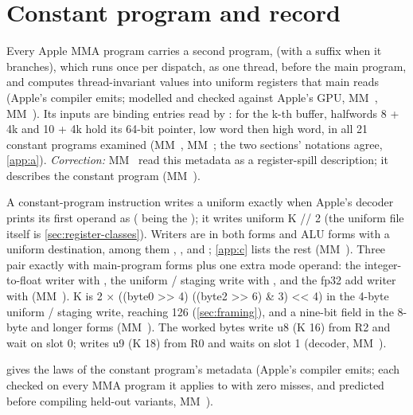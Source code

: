 \section{Constant program and record}\label{sec:constant-program-record}

Every Apple MMA program carries a second program,  (with a  suffix when
it branches), which runs once per dispatch, as one thread, before the main program, and computes thread-invariant values
into uniform registers that main reads (Apple's compiler emits; modelled and checked against Apple's GPU, MM~,
MM~). Its inputs are binding entries read by : for the k-th buffer,
halfwords 8 + 4k and 10 + 4k hold its 64-bit pointer, low word then high word, in all 21 constant programs examined
(MM~, MM~; the two sections' notations agree, \cref{app:a}). \emph{Correction:} MM~ read this metadata as a
register-spill description; it describes the constant program (MM~).

A constant-program instruction writes a uniform exactly when Apple's decoder
prints its first operand as  ( being the ); it writes uniform
K // 2 (the uniform file itself is \cref{sec:register-classes}). Writers are  in both forms and ALU forms
with a uniform destination, among them , ,  and ; \cref{app:c} lists the rest (MM~). Three pair exactly with main-program forms
plus one extra mode operand: the integer-to-float writer with , the uniform / staging
write with , and the fp32 add writer with 
(MM~). K is 2 × ((byte0 >{}> 4) \textbar{} ((byte2 >{}> 6) \& 3) <{}< 4) in the 4-byte uniform / staging write, reaching 126 (\cref{sec:framing}), and a nine-bit field in the 8-byte and longer forms (MM~). The
worked bytes 
write u8 (K 16) from R2 and wait on slot 0;  writes u9 (K 18) from R0 and waits on slot 1 (decoder,
MM~).

 gives the laws of the constant program's metadata (Apple's compiler emits; each checked on
every MMA program it applies to with zero misses, and predicted before compiling held-out variants, MM~).

